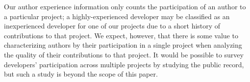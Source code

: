 Our author experience information only counts the participation of an
author to a particular project; a highly-experienced developer may be
classified as an inexperienced developer for one of our projects due
to a short history of contributions to that project. We expect,
however, that there is some value to characterizing authors by their
participation in a single project when analyzing the quality of their
contributions to that project. It would be possible to survey
developers' participation across multiple projects by studying the
public record, but such a study is beyond the scope of this paper.
